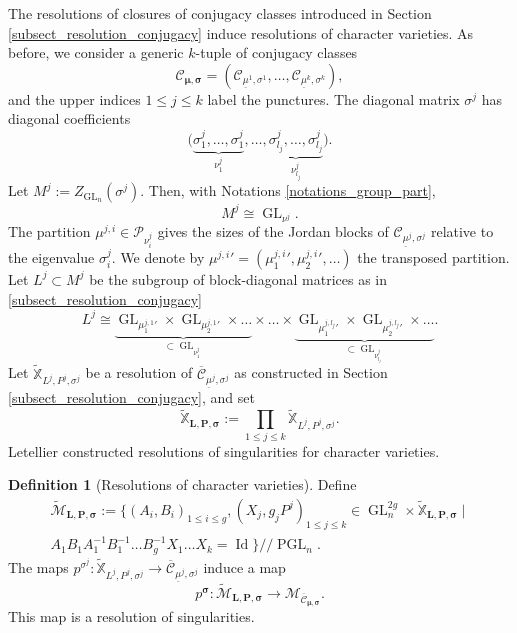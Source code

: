 \documentclass[JEP,XML,SOM,NoEqCountersInSection,Unicode,published]{cedram}
\newcommand{\gitquot}{/\!\!/}
\theoremstyle{definition}
\newtheorem{definition}{Definition}[section]
\theoremstyle{plain}
\DeclareMathOperator{\Id}{Id}
\DeclareMathOperator{\GL}{GL}
\DeclareMathOperator{\PGL}{PGL}
\newcommand{\Part}{\mathcal{P}}
\newcommand{\inv}{^{-1}}
\newcommand{\mlps}{\widetilde{\mathcal{M}}_{\boldsymbol{L},\boldsymbol{P},\boldsymbol{\sigma}}}
\begin{document}
The resolutions of closures of conjugacy classes introduced in Section \ref{subsect_resolution_conjugacy} induce resolutions of character varieties. As before, we consider a generic $k$-tuple of conjugacy classes
\[
\mathcal{C}_{\boldsymbol{\mu},\boldsymbol{\sigma}} =(\mathcal{C}_{\underline{\mu}^1,\sigma^1}, \dots, \mathcal{C}_{\underline{\mu}^k,\sigma^k}),
\]
and the upper indices $1\le j \le k$ label the punctures. The diagonal matrix $\sigma^j$ has diagonal coefficients
\[
\bigl(\underbrace{\sigma^j_1,\dots,\sigma^j_{1}}_{\nu^j_1},\dots, \underbrace{\sigma^j_{l_j},\dots,\sigma^j_{l_j}}_{\nu^j_{l_j}}\bigl).
\]
Let $M^j:= Z_{\GL_n} (\sigma^j)$. Then, with Notations \ref{notations_group_part},
\[
M^j\cong \GL_{\nu^j}.
\]
The partition $\mu^{j,i}\in \Part_{\nu^{j}_i}$ gives the sizes of the Jordan blocks of $\mathcal{C}_{\underline{\mu}^j,\sigma^j}$ relative to the eigenvalue $\sigma^j_i$. We denote by ${\mu^{j,i}}'=({\mu^{j,i}_1}',{\mu^{j,i}_2}',\dots)$ the transposed partition. Let $L^j\subset M^j$ be the subgroup of block-diagonal matrices as in \ref{subsect_resolution_conjugacy}
\[
L^j \cong \underbrace{\GL_{{\mu^{j,1}_1}'}\times \GL_{{\mu^{j,1}_2}'} \times \dots }_{\subset \GL_{\nu^j_1}}\times \dots \times \underbrace{\GL_{{\mu^{j,l_j}_1}'}\times \GL_{{\mu^{j,l_j}_2}'} \times \dots}_{\subset \GL_{\nu^j_{l_j}}}.
\]
Let $\mathbb{\widetilde{X}}_{L^j,P^j,\sigma^j}$ be a resolution of $\overline{\mathcal{C}}_{\underline{\mu}^j,\sigma^j}$ as constructed in Section \ref{subsect_resolution_conjugacy}, and set
\[
\mathbb{\widetilde{X}}_{\boldsymbol{L},\boldsymbol{P},\boldsymbol{\sigma}} := \prod_{1\le j\le k} \mathbb{\widetilde{X}}_{L^j,P^j,\sigma^j}.
\]
Letellier \cite{Letellier13} constructed resolutions of singularities for character varieties.
\begin{definition}[Resolutions of character varieties]\label{def_resol_char}
Define
\begin{multline}
\mlps := \bigl\lbrace(A_i, B_i)_{1\le i \le g}, (X_j, g_j P^j)_{1\le j \le k} \in \GL_n^{2 g}\times \mathbb{\widetilde{X}}_{\boldsymbol{L},\boldsymbol{P},\boldsymbol{\sigma}}\mid\\
A_1 B_1 A\inv_1 B\inv_1 \dots B\inv_g X_1\dots X_k = \Id\bigr\rbrace\gitquot\PGL_n.
\end{multline}
The maps $p^{\sigma^j} : \mathbb{\widetilde{X}}_{L^j,P^j,\sigma^j} \to \overline{\mathcal{C}}_{\underline{\mu}^j,\sigma^j}$ induce a map
\[
p^{\boldsymbol{\sigma}} : \mlps \to \mathcal{M}_{\overline{\mathcal{C}}_{\boldsymbol{\mu},\boldsymbol{\sigma}}}.
\]
This map is a resolution of singularities.
\end{definition}
\end{document}
